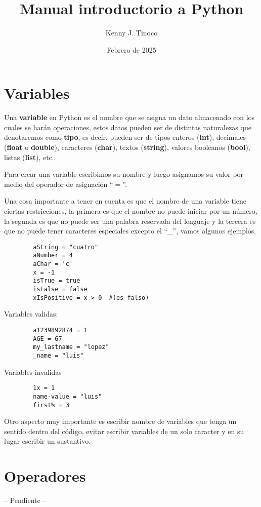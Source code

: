 \documentclass[12pt]{article}
\title{Manual introductorio a Python}
\author{Kenny J. Tinoco}
\date{Febrero de 2025}
\begin{document}
    \maketitle

    \tableofcontents

    \section{Variables}
    Una \textbf{variable} en Python es el nombre que se asigna un dato almacenado con los cuales se harán operaciones,
    estos datos pueden ser de distintas naturalezas que denotaremos como \textbf{tipo}, es decir, pueden ser de tipos
    enteros (\textbf{int}), decimales (\textbf{float} o \textbf{double}), caracteres (\textbf{char}),
    textos (\textbf{string}), valores booleanos (\textbf{bool}), listas (\textbf{list}), etc.

    Para crear una variable escribimos su nombre y luego asignamos su valor por medio del operador de asignación ``$=$''.

    Una cosa importante a tener en cuenta es que el nombre de una variable tiene ciertas restricciones, la primera es
    que el nombre no puede iniciar por un número, la segunda es que no puede ser una palabra reservada del lenguaje y
    la tercera es que no puede tener caracteres especiales excepto el ``\_'', vamos algunos ejemplos.
    \begin{lstlisting}
        aString = "cuatro"
        aNumber = 4
        aChar = 'c'
        x = -1
        isTrue = true
        isFalse = false
        xIsPositive = x > 0  #(es falso)
    \end{lstlisting}

    Variables validas:
    \begin{lstlisting}
        a1239892874 = 1
        AGE = 67
        my_lastname = "lopez"
        _name = "luis"
    \end{lstlisting}

    Variables invalidas
    \begin{lstlisting}
        1x = 1
        name-value = "luis"
        first% = 3
    \end{lstlisting}

    Otro aspecto muy importante es escribir nombre de variables que tenga un sentido dentro del código, evitar escribir
    variables de un solo caracter y en su lugar escribir un sustantivo.
    
    \section{Operadores}
    -- Pendiente --
    
\end{document}
